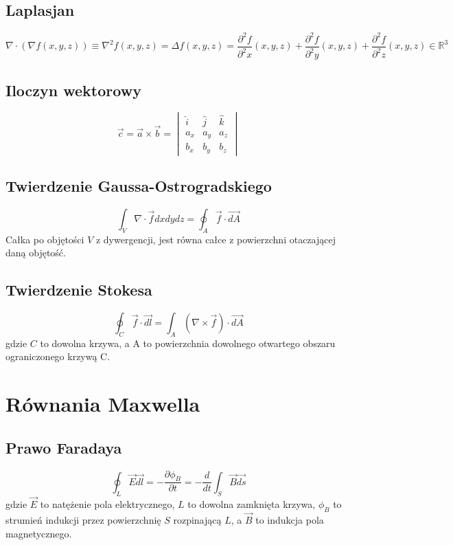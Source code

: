 \documentclass{../notatki}
\begin{document}
\subsection{Laplasjan}

$$
\nabla \cdot (\nabla f(x, y, z)) \equiv \nabla ^2 f(x, y, z) =
\Delta f(x, y, z) =
\frac{\partial^2 f}{\partial^2 x}(x, y, z) +
\frac{\partial^2 f}{\partial^2 y}(x, y, z) +
\frac{\partial^2 f}{\partial^2 z}(x, y, z)
\in \mathbb{R}^3
$$

\subsection{Iloczyn wektorowy}

$$
\vec{c} = \vec{a} \times \vec{b} =
\begin{vmatrix}
  \hat{i} & \hat{j} & \hat{k} \\
  a_x & a_y & a_z \\
  b_x & b_y & b_z
\end{vmatrix}
$$

\subsection{Twierdzenie Gaussa-Ostrogradskiego}

$$
\int_V \nabla \cdot \vec{f} dx dy dz = \oint_A \vec{f} \cdot \vec{dA}
$$
Całka po objętości $V$ z dywergencji, jest równa całce z powierzchni otaczającej
daną objętość.

\subsection{Twierdzenie Stokesa}

$$
\oint_C \vec{f} \cdot \vec{dl} = \int_A (\nabla \times \vec{f}) \cdot \vec{dA}
$$
gdzie $C$ to dowolna krzywa, a A to powierzchnia dowolnego otwartego obszaru
ograniczonego krzywą C.

\section{Równania Maxwella}

\subsection{Prawo Faradaya}

$$
\oint_L \vec{E} \vec{dl} = - \frac{\partial \phi_B}{\partial t} = -
\frac{d}{dt} \int_S \vec{B} \vec{ds}
$$
gdzie $\vec{E}$ to natężenie pola elektrycznego, $L$ to dowolna zamknięta
krzywa, $\phi_B$ to strumień indukcji przez powierzchnię $S$ rozpinającą $L$,
a $\vec{B}$ to indukcja pola magnetycznego.
\end{document}
